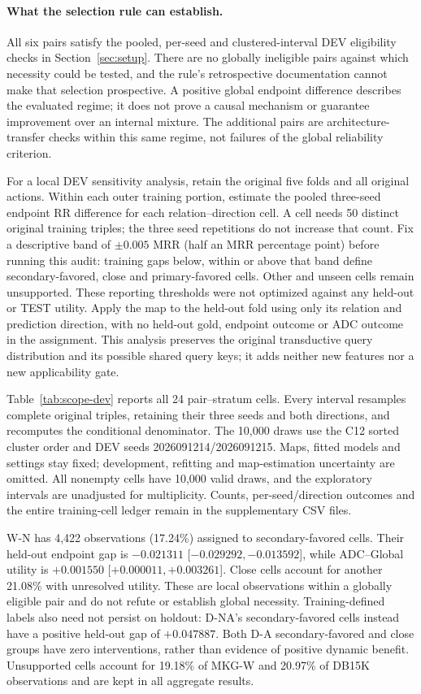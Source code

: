 \documentclass[11pt,a4paper]{article}
\begin{document}
\paragraph{What the selection rule can establish.}
All six pairs satisfy the pooled, per-seed and clustered-interval DEV eligibility checks in Section~\ref{sec:setup}. There are no globally ineligible pairs against which necessity could be tested, and the rule's retrospective documentation cannot make that selection prospective. A positive global endpoint difference describes the evaluated regime; it does not prove a causal mechanism or guarantee improvement over an internal mixture. The additional pairs are architecture-transfer checks within this same regime, not failures of the global reliability criterion.

For a local DEV sensitivity analysis, retain the original five folds and all original actions. Within each outer training portion, estimate the pooled three-seed endpoint RR difference for each relation--direction cell. A cell needs 50 distinct original training triples; the three seed repetitions do not increase that count. Fix a descriptive band of $\pm0.005$ MRR (half an MRR percentage point) before running this audit: training gaps below, within or above that band define secondary-favored, close and primary-favored cells. Other and unseen cells remain unsupported. These reporting thresholds were not optimized against any held-out or TEST utility. Apply the map to the held-out fold using only its relation and prediction direction, with no held-out gold, endpoint outcome or ADC outcome in the assignment. This analysis preserves the original transductive query distribution and its possible shared query keys; it adds neither new features nor a new applicability gate.

Table~\ref{tab:scope-dev} reports all 24 pair--stratum cells. Every interval resamples complete original triples, retaining their three seeds and both directions, and recomputes the conditional denominator. The 10,000 draws use the C12 sorted cluster order and DEV seeds 2026091214/2026091215. Maps, fitted models and settings stay fixed; development, refitting and map-estimation uncertainty are omitted. All nonempty cells have 10,000 valid draws, and the exploratory intervals are unadjusted for multiplicity. Counts, per-seed/direction outcomes and the entire training-cell ledger remain in the supplementary CSV files.

W-N has 4,422 observations (17.24\%) assigned to secondary-favored cells. Their held-out endpoint gap is $-0.021311$ [$-0.029292,-0.013592$], while ADC--Global utility is $+0.001550$ [$+0.000011,+0.003261$]. Close cells account for another 21.08\% with unresolved utility. These are local observations within a globally eligible pair and do not refute or establish global necessity. Training-defined labels also need not persist on holdout: D-NA's secondary-favored cells instead have a positive held-out gap of $+0.047887$. Both D-A secondary-favored and close groups have zero interventions, rather than evidence of positive dynamic benefit. Unsupported cells account for 19.18\% of MKG-W and 20.97\% of DB15K observations and are kept in all aggregate results.

\FloatBarrier
\end{document}
